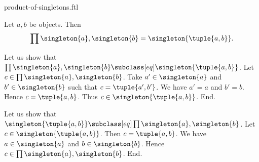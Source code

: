 \documentclass{article}
\begin{document}
\begin{smodule}[creators={Marcel Schütz}]{product-of-singletons.ftl}

  \begin{fproposition*}[label=6150003963723776]
    Let $a, b$ be objects.
    Then \[\prod{\singleton{a},\singleton{b}} = \singleton{\tuple{a,b}}. \]
  \end{fproposition*}
  \begin{fproof}
    Let us show that $\prod{\singleton{a},\singleton{b}} \subclass[eq] \singleton{\tuple{a,b}}$.
      Let $c \in \prod{\singleton{a},\singleton{b}}$.
      Take $a' \in \singleton{a}$ and $b' \in \singleton{b}$ such that $c = \tuple{a',b'}$.
      We have $a' = a$ and $b' = b$.
      Hence $c = \tuple{a,b}$.
      Thus $c \in \singleton{\tuple{a,b}}$.
    End.

    Let us show that $\singleton{\tuple{a,b}} \subclass[eq] \prod{\singleton{a},\singleton{b}}$.
      Let $c \in \singleton{\tuple{a,b}}$.
      Then $c = \tuple{a,b}$.
      We have $a \in \singleton{a}$ and $b \in \singleton{b}$.
      Hence $c \in \prod{\singleton{a},\singleton{b}}$.
    End.
  \end{fproof}
\end{smodule}
\end{document}
